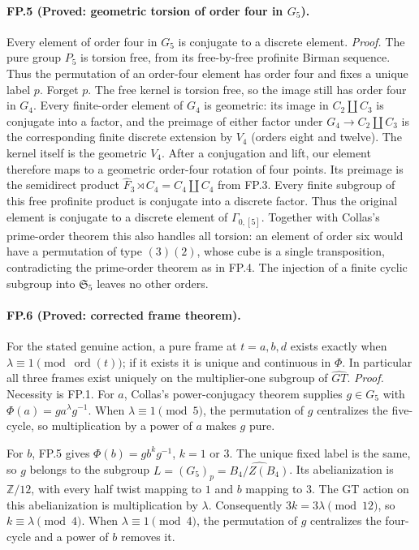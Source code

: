 \paragraph{FP.5 (Proved: geometric torsion of order four in $G_5$).}
Every element of order four in $G_5$ is conjugate to a discrete element.
\emph{Proof.} The pure group $P_5$ is torsion free, from its free-by-free
profinite Birman sequence. Thus the permutation of an order-four element
has order four and fixes a unique label $p$. Forget $p$. The free kernel is
torsion free, so the image still has order four in $G_4$.
Every finite-order element of $G_4$ is geometric: its image in
$C_2\amalg C_3$ is conjugate into a factor, and the preimage of either
factor under $G_4\to C_2\amalg C_3$ is the corresponding finite discrete
extension by $V_4$ (orders eight and twelve). The kernel itself is the
geometric $V_4$.
After a conjugation and lift, our element therefore maps to a geometric
order-four rotation of four points. Its preimage is the semidirect product
$\widehat F_3\rtimes C_4=C_4\amalg C_4$ from FP.3. Every finite subgroup
of this free profinite product is conjugate into a discrete factor. Thus
the original element is conjugate to a discrete element of $\Gamma_{0,[5]}$.
Together with Collas's prime-order theorem this also handles all torsion:
an element of order six would have a permutation of type $(3)(2)$, whose
cube is a single transposition, contradicting the prime-order theorem as
in FP.4. The injection of a finite cyclic subgroup into $\mathfrak S_5$
leaves no other orders.

\paragraph{FP.6 (Proved: corrected frame theorem).}
For the stated genuine action, a pure frame at $t=a,b,d$ exists exactly
when $\lambda\equiv1\pmod{\operatorname{ord}(t)}$; if it exists it is
unique and continuous in $\Phi$. In particular all three frames exist
uniquely on the multiplier-one subgroup of $\widehat{GT}$.
\emph{Proof.} Necessity is FP.1. For $a$, Collas's power-conjugacy theorem
supplies $g\in G_5$ with $\Phi(a)=ga^\lambda g^{-1}$. When
$\lambda\equiv1\pmod5$, the permutation of $g$ centralizes the five-cycle,
so multiplication by a power of $a$ makes $g$ pure.

For $b$, FP.5 gives $\Phi(b)=g b^k g^{-1}$, $k=1$ or $3$.
The unique fixed label is the same, so $g$ belongs to the subgroup
$L=(G_5)_p=\widehat{B_4/Z(B_4)}$. Its abelianization is
$\mathbb Z/12$, with every half twist mapping to $1$ and $b$ mapping to $3$.
The GT action on this abelianization is multiplication by $\lambda$.
Consequently $3k=3\lambda\pmod{12}$, so $k\equiv\lambda\pmod4$.
When $\lambda\equiv1\pmod4$, the permutation of $g$ centralizes the
four-cycle and a power of $b$ removes it.

